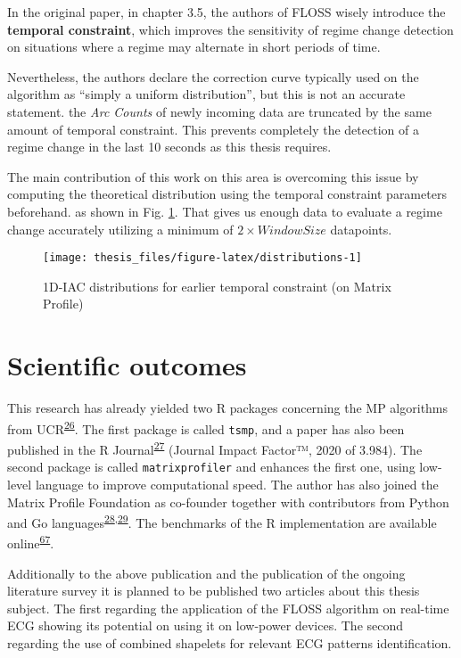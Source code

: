 \documentclass[12pt,twoside]{fmupthesis}
\begin{document}
In the original paper, in chapter 3.5, the authors of FLOSS wisely introduce the \textbf{temporal
constraint}, which improves the sensitivity of regime change detection on situations where
a regime may alternate in short periods of time.

Nevertheless, the authors declare the correction curve typically used on the algorithm as ``simply a
uniform distribution'', but this is not an accurate statement. the \emph{Arc Counts} of newly incoming
data are truncated by the same amount of temporal constraint. This prevents completely the detection
of a regime change in the last 10 seconds as this thesis requires.

The main contribution of this work on this area is overcoming this issue by computing the
theoretical distribution using the temporal constraint parameters beforehand. as shown in Fig.
\ref{fig:distributions}. That gives us enough data to evaluate a regime change accurately utilizing
a minimum of \(2 \times WindowSize\) datapoints.
\begin{figure}

{\centering \texttt{[image: thesis\_files/figure-latex/distributions-1]} 

}

\caption{1D-IAC distributions for earlier temporal constraint (on Matrix Profile)}\label{fig:distributions}
\end{figure}
\hypertarget{scientific-outcomes}{%
\chapter{Scientific outcomes}\label{scientific-outcomes}}

This research has already yielded two R packages concerning the MP algorithms from UCR\textsuperscript{\protect\hyperlink{ref-mpucr}{26}}. The
first package is called \texttt{tsmp}, and a paper has also been published in the R Journal\textsuperscript{\protect\hyperlink{ref-RJ-2020-021}{27}}
(Journal Impact Factor™, 2020 of 3.984). The second package is called \texttt{matrixprofiler} and enhances
the first one, using low-level language to improve computational speed. The author has also joined
the Matrix Profile Foundation as co-founder together with contributors from Python and Go languages\textsuperscript{\protect\hyperlink{ref-mpf2020}{28},\protect\hyperlink{ref-VanBenschoten2020}{29}}. The benchmarks of the R implementation are available online\textsuperscript{\protect\hyperlink{ref-Bischoff2021a}{67}}.

Additionally to the above publication and the publication of the ongoing literature survey it is planned
to be published two articles about this thesis subject. The first regarding the application of the
FLOSS algorithm on real-time ECG showing its potential on using it on low-power devices. The second
regarding the use of combined shapelets for relevant ECG patterns identification.
\end{document}

